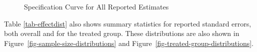 \documentclass[
  letterpaper,
  DIV=11,
  numbers=noendperiod]{scrartcl}
\begin{document}
\begin{figure}


\caption{\label{fig-full-effect-distribution}Specification Curve for All
Reported Estimates}

\end{figure}%

Table \ref{tab-effectdist} also shows summary statistics for reported
standard errors, both overall and for the treated group. These
distributions are also shown in
Figure~\ref{fig-sample-size-distributions} and
Figure~\ref{fig-treated-group-distributions}.
\end{document}
